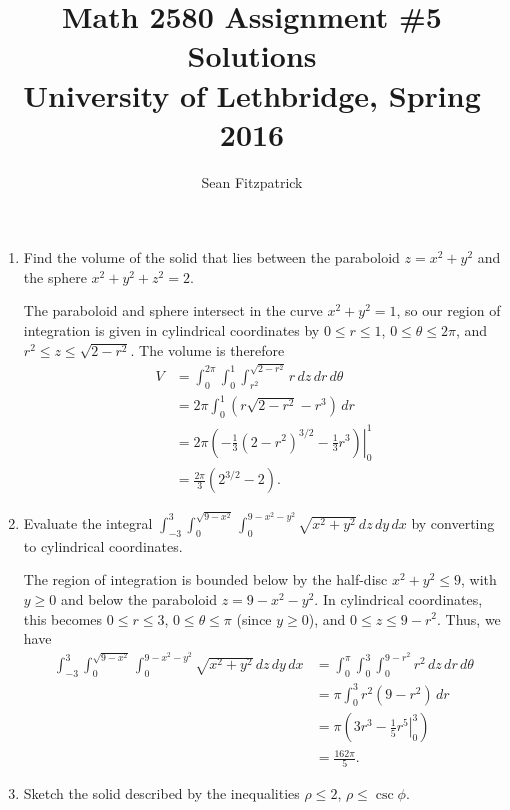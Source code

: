 \documentclass[letterpaper,12pt]{article}
\title{Math 2580 Assignment \#5 Solutions\\University of Lethbridge, Spring 2016}
\author{Sean Fitzpatrick}
\newcommand{\di}{\displaystyle}
\begin{document}
 \maketitle

\begin{enumerate}
\item  Find the volume of the solid that lies between the paraboloid $z=x^2+y^2$ and the sphere $x^2+y^2+z^2=2$.

\bigskip

The paraboloid and sphere intersect in the curve $x^2+y^2=1$, so our region of integration is given in cylindrical coordinates by $0\leq r\leq 1$, $0\leq \theta\leq 2\pi$, and $r^2\leq z\leq \sqrt{2-r^2}$. The volume is therefore
\begin{align*}
 V & = \int_0^{2\pi}\int_0^1\int_{r^2}^{\sqrt{2-r^2}} r\,dz\,dr\,d\theta\\
 & = 2\pi\int_0^1 \left(r\sqrt{2-r^2}-r^3\right)\,dr\\
 & = 2\pi\left.\left(-\frac{1}{3}(2-r^2)^{3/2}-\frac{1}{3}r^3\right)\right|_0^1\\
 & = \frac{2\pi}{3}\left(2^{3/2}-2\right).
\end{align*}

\bigskip

\item  Evaluate the integral $\di \int_{-3}^3\int_0^{\sqrt{9-x^2}}\int_0^{9-x^2-y^2}\sqrt{x^2+y^2}\, dz\,dy\,dx$ by converting to cylindrical coordinates.

\bigskip

The region of integration is bounded below by the half-disc $x^2+y^2\leq 9$, with $y\geq 0$ and below the paraboloid $z=9-x^2-y^2$. In cylindrical coordinates, this becomes $0\leq r\leq 3$, $0\leq \theta\leq \pi$ (since $y\geq 0$), and $0\leq z\leq 9-r^2$. Thus, we have
\begin{align*}
 \int_{-3}^3\int_0^{\sqrt{9-x^2}}\int_0^{9-x^2-y^2}\sqrt{x^2+y^2}\, dz\,dy\,dx & = \int_0^{\pi}\int_0^3\int_0^{9-r^2} r^2\,dz\,dr\,d\theta\\
 & = \pi\int_0^3 r^2(9-r^2)\,dr\\
 & = \pi\left(\left. 3r^3-\frac{1}{5}r^5\right|_0^3\right)\\
 & = \frac{162\pi}{5}.
\end{align*}


\bigskip


\item  Sketch the solid described by the inequalities $\rho\leq 2$, $\rho\leq \csc \phi$.


\end{enumerate}
\end{document}
